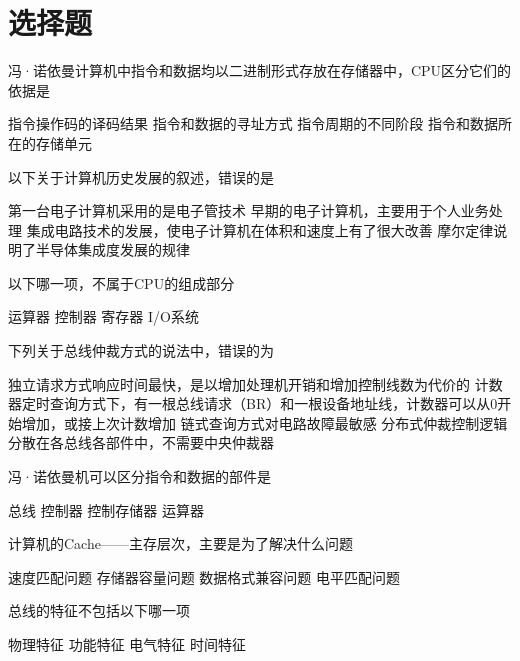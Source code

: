\documentclass[a4paper]{exam}
\newif\ifprint
\newcommand{\blank}[2][1cm]{\uline{\makebox[#1][c]{%
			\ifprint
			\phantom{#2}%
			\else
			#2%
			\fi}}}
\begin{document}
\section{选择题}
\begin{questions}
	\question 冯·诺依曼计算机中指令和数据均以二进制形式存放在存储器中，CPU区分它们的依据是\blank[0.5cm]{}
	\begin{choices}
		\choice 指令操作码的译码结果
		\choice 指令和数据的寻址方式
		\choice 指令周期的不同阶段
		\choice 指令和数据所在的存储单元
	\end{choices}

	\question 以下关于计算机历史发展的叙述，错误的是\blank{}
	\begin{choices}
		\choice 第一台电子计算机采用的是电子管技术
		\choice 早期的电子计算机，主要用于个人业务处理
		\choice 集成电路技术的发展，使电子计算机在体积和速度上有了很大改善
		\choice 摩尔定律说明了半导体集成度发展的规律
	\end{choices}

	\question 以下哪一项，不属于CPU的组成部分\blank{}
	\begin{choices}
		\choice 运算器
		\choice 控制器
		\choice 寄存器
		\choice I/O系统
	\end{choices}

	\question 下列关于总线仲裁方式的说法中，错误的为\blank{}
	\begin{choices}
		\choice 独立请求方式响应时间最快，是以增加处理机开销和增加控制线数为代价的
		\choice 计数器定时查询方式下，有一根总线请求（BR）和一根设备地址线，计数器可以从0开始增加，或接上次计数增加
		\choice 链式查询方式对电路故障最敏感
		\choice 分布式仲裁控制逻辑分散在各总线各部件中，不需要中央仲裁器
	\end{choices}

	\question 冯·诺依曼机可以区分指令和数据的部件是\blank{}
	\begin{choices}
		\choice 总线
		\choice 控制器
		\choice 控制存储器
		\choice 运算器
	\end{choices}

	\question 计算机的Cache——主存层次，主要是为了解决什么问题\blank{}
	\begin{choices}
		\choice 速度匹配问题
		\choice 存储器容量问题
		\choice 数据格式兼容问题
		\choice 电平匹配问题
	\end{choices}

	\question 总线的特征不包括以下哪一项\blank{}
	\begin{choices}
		\choice 物理特征
		\choice 功能特征
		\choice 电气特征
		\choice 时间特征
	\end{choices}


\end{questions}
\end{document}
